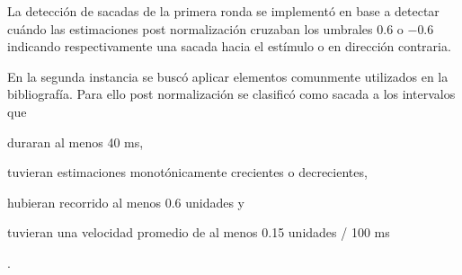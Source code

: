   La detección de sacadas de la primera ronda se implementó en base a detectar
  cuándo las estimaciones post normalización cruzaban los umbrales $0.6$ o
  $-0.6$ indicando respectivamente una sacada hacia el estímulo o en dirección
  contraria.

  En la segunda instancia se buscó aplicar elementos comunmente utilizados en
  la bibliografía.
  Para ello post normalización se clasificó como sacada a los intervalos que
  \begin{enumerate*}
    \item duraran al menos 40 ms,
    \item tuvieran estimaciones monotónicamente crecientes o decrecientes,
    \item hubieran recorrido al menos 0.6 unidades y
    \item tuvieran una velocidad promedio de al menos 0.15 unidades / 100 ms
  \end{enumerate*}.

